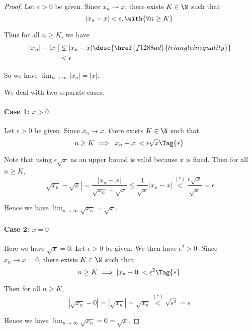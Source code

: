 \begin{proof}
   Let $\epsilon>0$ be given. Since $x_n\to x$, there exists
  $K\in\N$ such that
  $$
    |x_n-x|<\epsilon,\with{\forall n\geq K}
  $$

  Thus for all $n\geq K$, we have
  \begin{align*}
    \big|{|x_n|-|x|}\big|
     &\leq |x_n-x|\desc{\href{f1288ad}{triangle inequality}} \\
     &<\epsilon
  \end{align*}

  So we have $\displaystyle\lim_{n\to\infty}|x_n|=|x|$.

   We deal with two separate cases:

  \paragraph{Case 1: $x>0$}

  Let $\epsilon>0$ be given. Since $x_n\to x$, there exists $K\in\N$ such that
  \begin{equation*}
    n\geq K\implies |x_n-x|<\epsilon\sqrt x\Tag{*}
  \end{equation*}

  Note that using $\epsilon\sqrt x$ as an upper bound is valid because $x$ is
  fixed. Then for all $n\geq K$,
  $$
    |\sqrt{x_n}-\sqrt x|=\frac{|x_n-x|}{\sqrt{x_n}+\sqrt x}
    \leq\frac1{\sqrt x}|x_n-x|\stackrel{(*)}{<}\frac{\epsilon\sqrt x}{\sqrt x}
    =\epsilon
  $$

  Hence we have $\displaystyle\lim_{n\to\infty}\sqrt{x_n}=\sqrt x$.

  \paragraph{Case 2: $x=0$}

  Here we have $\sqrt x=0$. Let $\epsilon>0$ be given. We then have
  $\epsilon^2>0$. Since $x_n\to x=0$, there exists $K\in\N$ such that
  \begin{equation*}
    n\geq K\implies |x_n-0|<\epsilon^2\Tag{*}
  \end{equation*}

  Then for all $n\geq K$,
  $$
    |\sqrt{x_n}-0|=|\sqrt{x_n}|=\sqrt{x_n}\stackrel{(*)}{<}\sqrt{\epsilon^2}=\epsilon
  $$

  Hence we have $\displaystyle\lim_{n\to\infty}\sqrt{x_n}=0=\sqrt x$.
\end{proof}

